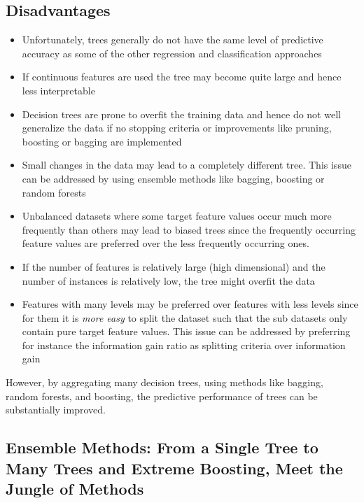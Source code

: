 \documentclass[%
oneside,                 %
final,                   %
10pt]{article}
\begin{document}
\noindent
\subsection*{Disadvantages}

\begin{itemize}
\item Unfortunately, trees generally do not have the same level of predictive accuracy as some of the other regression and classification approaches

\item If continuous features are used the tree may become quite large and hence less interpretable

\item Decision trees are prone to overfit the training data and hence do not well generalize the data if no stopping criteria or improvements like pruning, boosting or bagging are implemented

\item Small changes in the data may lead to a completely different tree. This issue can be addressed by using ensemble methods like bagging, boosting or random forests

\item Unbalanced datasets where some target feature values occur much more frequently than others may lead to biased trees since the frequently occurring feature values are preferred over the less frequently occurring ones. 

\item If the number of features is relatively large (high dimensional) and the number of instances is relatively low, the tree might overfit the data

\item Features with many levels may be preferred over features with less levels since for them it is \emph{more easy} to split the dataset such that the sub datasets only contain pure target feature values. This issue can be addressed by preferring for instance the information gain ratio as splitting criteria over information gain
\end{itemize}

\noindent
However, by aggregating many decision trees, using methods like bagging, random forests, and boosting, the predictive performance of trees can be substantially improved. 


\subsection*{Ensemble Methods: From a Single Tree to Many Trees and Extreme Boosting, Meet the Jungle of Methods}
\end{document}
